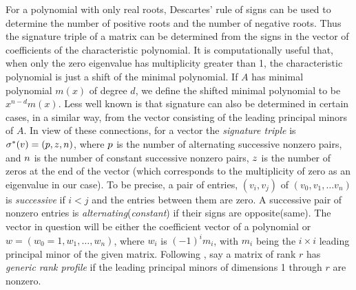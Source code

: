 \documentclass{sig-alternate}
\begin{document}
For a polynomial with only real roots, Descartes' rule of signs can be used to 
determine the number of positive roots and the number of negative roots.
Thus the signature triple of a matrix can be determined from the signs in 
the vector of coefficients of the characteristic polynomial.  
It is computationally useful that,
when only the zero eigenvalue has multiplicity greater
than 1, the characteristic polynomial is just a shift of the minimal 
polynomial.  If $A$ has minimal polynomial $m(x)$ of degree $d$, we define
the shifted minimal polynomial to be $x^{n-d} m(x)$.  
Less well known
is that signature can also be determined in certain cases, in a similar way, 
from the vector consisting of the leading principal minors of $A$. 
In view of these connections, for a vector the {\em signature triple} 
is 
$\sigma^{*}(v) = (p, z, n)$, where
$p$ is the number of alternating successive nonzero pairs, and 
$n$ is the number of constant successive nonzero pairs,
$z$ is the number of zeros at the end of the vector
(which corresponds to the multiplicity of zero as an eigenvalue in our case).
To be precise, 
a pair of entries, $(v_i, v_j)$ of $(v_0, v_1, \ldots v_n)$ is {\em successive} 
if $i < j$ and the entries between them are zero.
A successive pair of nonzero entries is {\em alternating}({\em constant}) if 
their signs are opposite(same).
The vector in question will be either the coefficient vector of a polynomial or 
$w = (w_0 = 1, w_1, \ldots, w_n)$, where $w_i$ is $(-1)^i m_i$, with $m_i$ being
the $i\times i$ leading principal minor of the given matrix. 
Following \cite{KaLo96:issac},
say a matrix of rank $r$ has 
{\em generic rank profile} if the leading principal minors 
of dimensions 1 through $r$ are nonzero. 
\end{document}
